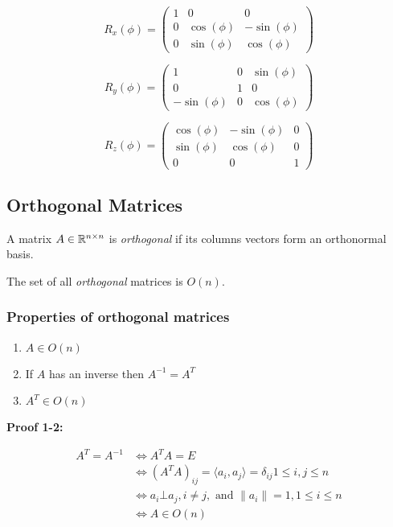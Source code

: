 \[
    R_x (\phi) =
    \begin{pmatrix}
        1 & 0 & 0 \\
        0 & \cos(\phi) & -\sin(\phi) \\
        0 & \sin(\phi) & \cos(\phi)
    \end{pmatrix}
\]

\[
    R_y (\phi) =
    \begin{pmatrix}
        1 & 0 & \sin(\phi) \\
        0 & 1 & 0 \\
        -\sin(\phi) & 0 & \cos(\phi)
    \end{pmatrix}
\]

\[
    R_z (\phi) =
    \begin{pmatrix}
        \cos(\phi) & -\sin(\phi) & 0 \\
        \sin(\phi) & \cos(\phi) & 0 \\
        0 & 0 & 1
    \end{pmatrix}
\]


\subsection{Orthogonal Matrices}

A matrix \(A \in \mathbb{R}^{n \times n}\) is \emph{orthogonal} if its columns vectors form an orthonormal 
basis.
\vspace{\baselineskip}

The set of all \emph{orthogonal} matrices is \(O(n)\).

\subsubsection{Properties of orthogonal matrices}

\begin{enumerate}
    \item \(A \in O(n)\)
    \item If \(A\) has an inverse then \(A^{-1} = A^T\)
    \item \(A^T \in O(n)\)
\end{enumerate}

\textbf{Proof 1-2:}

\begin{align*}
    A^T = A^{-1} &\iff A^T A = E\\
                 &\iff (A^T A)_{ij} = \langle a_i, a_j\rangle = \delta_{ij} 1 \le i,j \le n\\
                 &\iff a_i \bot a_j, i \ne j, \text{ and } \|a_i\| = 1, 1 \le i \le n\\
                 &\iff A \in O(n)
\end{align*}

